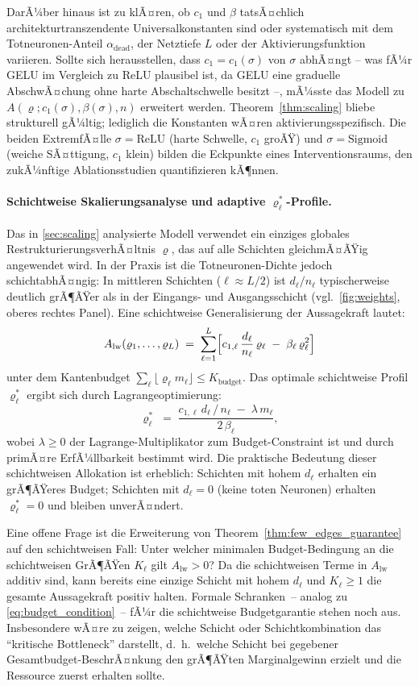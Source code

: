 ﻿\documentclass[12pt, a4paper, openany]{report}
\begin{document}
DarÃ¼ber hinaus ist zu klÃ¤ren, ob $c_1$ und $\beta$ tatsÃ¤chlich
architekturtranszendente Universalkonstanten sind oder systematisch mit dem
Totneuronen-Anteil $\alpha_{\mathrm{dead}}$, der Netztiefe $L$ oder der
Aktivierungsfunktion variieren.  Sollte sich herausstellen, dass
$c_1 = c_1(\sigma)$ von $\sigma$ abhÃ¤ngt -- was fÃ¼r GELU im Vergleich zu
ReLU plausibel ist, da GELU eine graduelle AbschwÃ¤chung ohne harte
Abschaltschwelle besitzt --, mÃ¼sste das Modell zu
$A(\varrho; c_1(\sigma), \beta(\sigma), n)$ erweitert werden.
Theorem~\ref{thm:scaling} bliebe strukturell gÃ¼ltig; lediglich die
Konstanten wÃ¤ren aktivierungsspezifisch.  Die beiden ExtremfÃ¤lle
$\sigma = \mathrm{ReLU}$ (harte Schwelle, $c_1$ groÃŸ) und
$\sigma = \mathrm{Sigmoid}$ (weiche SÃ¤ttigung, $c_1$ klein) bilden die
Eckpunkte eines Interventionsraums, den zukÃ¼nftige Ablationsstudien
quantifizieren kÃ¶nnen.

\paragraph{Schichtweise Skalierungsanalyse und adaptive $\varrho^*_\ell$-Profile.}
Das in \cref{sec:scaling} analysierte Modell verwendet ein einziges globales
RestrukturierungsverhÃ¤ltnis $\varrho$, das auf alle Schichten gleichmÃ¤ÃŸig
angewendet wird.  In der Praxis ist die Totneuronen-Dichte jedoch
schichtabhÃ¤ngig: In mittleren Schichten ($\ell \approx L/2$) ist
$d_\ell / n_\ell$ typischerweise deutlich grÃ¶ÃŸer als in der Eingangs- und
Ausgangsschicht (vgl.\ \cref{fig:weights}, oberes rechtes Panel).  Eine
schichtweise Generalisierung der Aussagekraft lautet:
\[
  A_{\mathrm{lw}}(\varrho_1, \ldots, \varrho_L)
  \;=\; \sum_{\ell=1}^{L}
  \Bigl[
    c_{1,\ell} \,\frac{d_\ell}{n_\ell}\, \varrho_\ell
    \;-\; \beta_\ell \,\varrho_\ell^2
  \Bigr]
\]
unter dem Kantenbudget $\sum_\ell \lfloor \varrho_\ell m_\ell \rfloor \leq K_{\mathrm{budget}}$.
Das optimale schichtweise Profil $\varrho^*_\ell$ ergibt sich durch Lagrange\-optimierung:
\[
  \varrho^*_\ell
  \;=\; \frac{c_{1,\ell}\,d_\ell\,/\,n_\ell \;-\; \lambda\,m_\ell}{2\,\beta_\ell},
\]
wobei $\lambda \geq 0$ der Lagrange-Multiplikator zum Budget-Constraint ist
und durch primÃ¤re ErfÃ¼llbarkeit bestimmt wird.  Die praktische Bedeutung
dieser schichtweisen Allokation ist erheblich: Schichten mit hohem $d_\ell$
erhalten ein grÃ¶ÃŸeres Budget; Schichten mit $d_\ell = 0$ (keine toten
Neuronen) erhalten $\varrho^*_\ell = 0$ und bleiben unverÃ¤ndert.

Eine offene Frage ist die Erweiterung von Theorem~\ref{thm:few_edges_guarantee}
auf den schichtweisen Fall: Unter welcher minimalen Budget-Bedingung an die
schichtweisen GrÃ¶ÃŸen $K_\ell$ gilt $A_{\mathrm{lw}} > 0$?  Da die
schichtweisen Terme in $A_{\mathrm{lw}}$ additiv sind, kann bereits eine
einzige Schicht mit hohem $d_\ell$ und $K_\ell \geq 1$ die gesamte
Aussagekraft positiv halten.  Formale Schranken~-- analog zu
\eqref{eq:budget_condition}~-- fÃ¼r die schichtweise Budgetgarantie stehen
noch aus.  Insbesondere wÃ¤re zu zeigen, welche Schicht oder Schichtkombination
das ``kritische Bottleneck'' darstellt, d.~h.\ welche Schicht bei gegebener
Gesamtbudget-BeschrÃ¤nkung den grÃ¶ÃŸten Marginalgewinn erzielt und die
Ressource zuerst erhalten sollte.
\end{document}

